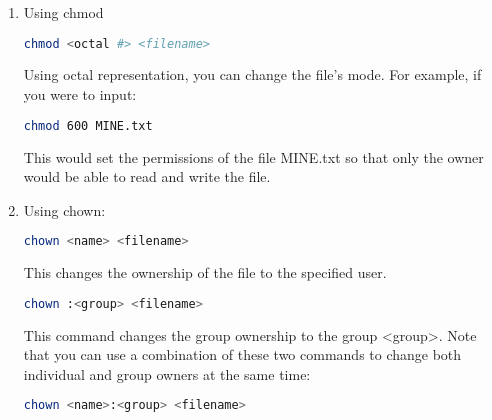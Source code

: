 \documentclass[11pt,a4paper]{article}
\begin{document}
\begin{enumerate}

\item Using chmod

\begin{lstlisting}[basicstyle=\ttfamily, backgroundcolor = \color{lightgray}, language = bash, xleftmargin = 0cm, framexleftmargin = 1em, breaklines=true]
chmod <octal #> <filename>
\end{lstlisting}

Using octal representation, you can change the file's mode. For example, if you were to input:

\begin{lstlisting}[basicstyle=\ttfamily, backgroundcolor = \color{lightgray}, language = bash, xleftmargin = 0cm, framexleftmargin = 1em, breaklines=true]
chmod 600 MINE.txt
\end{lstlisting}
			
This would set the permissions of the file MINE.txt so that only the owner would be able to read and write the file.

\item Using chown:

\begin{lstlisting}[basicstyle=\ttfamily, backgroundcolor = \color{lightgray}, language = bash, xleftmargin = 0cm, framexleftmargin = 1em, breaklines=true]
chown <name> <filename>
\end{lstlisting}

This changes the ownership of the file to the specified user.

\begin{lstlisting}[basicstyle=\ttfamily, backgroundcolor = \color{lightgray}, language = bash, xleftmargin = 0cm, framexleftmargin = 1em, breaklines=true]
chown :<group> <filename>
\end{lstlisting}
			
This command changes the group ownership to the group \textless group\textgreater. Note that you can use a combination of these two commands to change both individual and group owners at the same time:

\begin{lstlisting}[basicstyle=\ttfamily, backgroundcolor = \color{lightgray}, language = bash, xleftmargin = 0cm, framexleftmargin = 1em, breaklines=true]
chown <name>:<group> <filename>
\end{lstlisting}
			
\end{enumerate}
\end{document}
